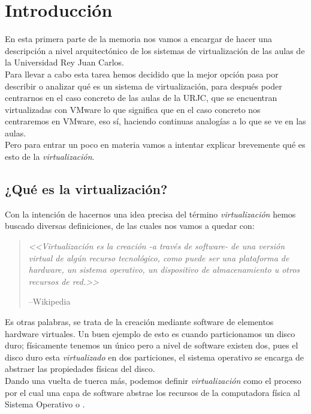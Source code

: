 \chapter{Introducción}
\lettrine[lines=1,slope=4pt,findent=0pt]{E}{}n esta primera parte de la memoria nos vamos a encargar de hacer una descripción a nivel arquitectónico de los sistemas de virtualización de las aulas de la Universidad Rey Juan Carlos.\\

Para llevar a cabo esta tarea hemos decidido que la mejor opción pasa por describir o analizar qué es un sistema de virtualización, para después poder centrarnos en el caso concreto de las aulas de la URJC, que se encuentran virtualizadas con VMware\cite{vmware} lo que significa que en el caso concreto nos centraremos en VMware, eso sí, haciendo continuas analogías a lo que se ve en las aulas.\\

Pero para entrar un poco en materia vamos a intentar explicar brevemente qué es esto de la \emph{virtualización}.

\section{¿Qué es la virtualización?}
Con la intención de hacernos una idea precisa del término \emph{virtualización} hemos buscado diversas definiciones, de las cuales nos vamos a quedar con:
\begin{quote}
\emph{<<Virtualización es la creación -a través de software- de una versión virtual de algún recurso tecnológico, como puede ser una plataforma de hardware, un sistema operativo, un dispositivo de almacenamiento u otros recursos de red.>>}
\begin{flushright}
--Wikipedia\cite{defvirwiki}
\end{flushright}
\end{quote}

Es otras palabras, se trata de la creación mediante software de elementos hardware virtuales. Un buen ejemplo de esto es cuando particionamos un disco duro; físicamente tenemos un único \emph{} pero a nivel de software existen dos, pues el disco duro esta \emph{virtualizado} en dos particiones, el sistema operativo se encarga de abstraer las propiedades físicas del disco.\\

Dando una vuelta de tuerca más, podemos definir \emph{virtualización} como el proceso por el cual una capa de software \emph{} abstrae los recursos de la computadora física al Sistema Operativo o \emph{}.\\

